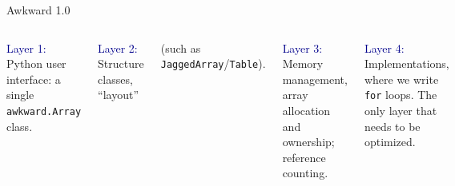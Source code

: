 \documentclass[aspectratio=169]{beamer}
\begin{document}
\begin{frame}{Awkward 1.0}
\large
\vspace{0.5 cm}
\begin{columns}
\vspace{-0.2 cm}

\textcolor{darkblue}{Layer 1:} Python user interface: a single \texttt{awkward.Array} class.
\vspace{\baselineskip}

\vspace{0.18 cm}
\textcolor{darkblue}{Layer 2:} Structure classes, ``layout''

(such as \texttt{JaggedArray}/\texttt{Table}).
\vspace{\baselineskip}

\vspace{0.18 cm}
\textcolor{darkblue}{Layer 3:} Memory management, array allocation and ownership; reference counting.
\vspace{\baselineskip}

\vspace{0.18 cm}
\textcolor{darkblue}{Layer 4:} Implementations, where we write \texttt{for} loops. The only layer that needs to be optimized.

\includegraphics[width=\linewidth]{awkward-1-0-layers.pdf}
\end{columns}
\end{frame}
\end{document}
